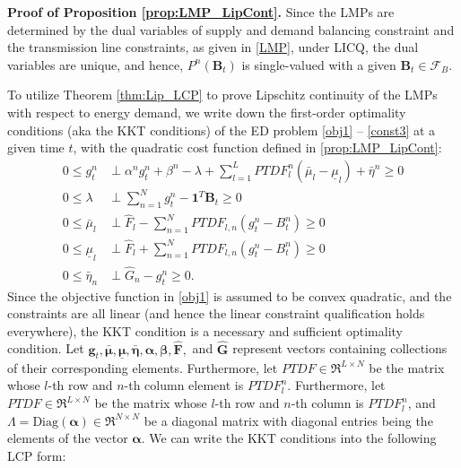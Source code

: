 \documentclass{article}
\theoremstyle{definition}
\theoremstyle{plain}
\begin{document}
\noindent\textbf{Proof of Proposition \ref{prop:LMP_LipCont}.} 
Since the LMPs are determined by the dual variables of supply and demand balancing constraint and the transmission line constraints, as given in \eqref{LMP}, under LICQ, the 
dual variables are unique, and hence, $P^n(\mathbf{B}_t)$ is single-valued with a given $\mathbf{B}_t \in \mathcal{F}_B.$

To utilize Theorem \ref{thm:Lip_LCP} to prove Lipschitz continuity of the LMPs with respect to energy demand, we write down the first-order optimality conditions (aka the KKT conditions) of the ED problem \eqref{obj1} -- \eqref{const3} at a given time $t$, with the quadratic cost function defined in \ref{prop:LMP_LipCont}:
\begin{align*}
0 \leq g_{t}^n & \perp  \alpha^n g_{t}^n + \beta^n - \lambda + \sum_{l=1}^L PTDF_{l}^n(\bar{\mu}_l - \underline{\mu}_l) + \bar{\eta}^n \geq 0 \\
0  \leq  \lambda \ & \perp  \sum_{n=1}^N g_{t}^n - \mathbf{1}^T  \mathbf{B}_t \geq 0 \\
0 \leq \bar{\mu}_l & \perp \widehat{F}_l - \sum_{n=1}^N PTDF_{l,n} (g_{t}^n - B_t^n) \geq 0 \\ 
0 \leq \underline{\mu}_l & \perp \widehat{F}_l + \sum_{n=1}^N PTDF_{l,n} (g_{t}^n - B_t^n) \geq 0\\
0 \leq \bar{\eta}_n & \perp \widehat{G}_n - g_t^n \geq 0.  
\end{align*}
Since the objective function in \eqref{obj1} is assumed to be convex quadratic, and the constraints are all linear (and hence the linear constraint qualification holds everywhere), the KKT condition is a necessary and sufficient optimality condition. 
Let $\mathbf{g}_t , \bm{\bar{\mu}}, \bm{\underline{\mu}}, \bm{\bar{\eta}}, \bm{\alpha}, \bm{\beta}, \bm{\widehat{F}},$ and $\bm{\widehat{G}}$ represent vectors containing collections of their corresponding elements. Furthermore, let $PTDF \in \Re^{L \times N}$ be the matrix whose $l$-th row and $n$-th column element is $PTDF_{l}^n$.
Furthermore, let $PTDF \in \Re^{L \times N}$ be the matrix whose $l$-th row and $n$-th column is $PTDF_{l}^n$, and $\Lambda = \mathrm{Diag}(\bm{\alpha}) \in \Re^{N \times N}$ be a diagonal matrix with diagonal entries being the elements of the vector $\bm{\alpha}$. We can write the KKT conditions into the following LCP form:
\end{document}
